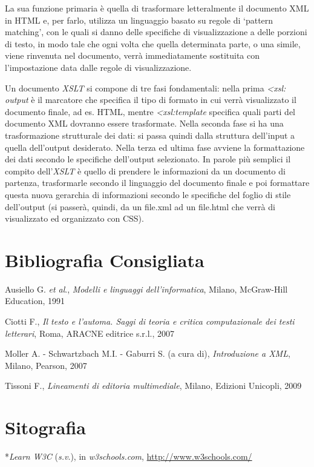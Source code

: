 {La sua funzione primaria è quella di trasformare letteralmente il
documento XML in HTML e, per farlo, utilizza un linguaggio basato su
regole di `pattern matching', con le quali si danno delle specifiche di
visualizzazione a delle porzioni di testo, in modo tale che ogni volta
che quella determinata parte, o una simile, viene rinvenuta nel
documento, verrà immediatamente sostituita con l'impostazione data dalle
regole di visualizzazione.

Un documento \emph{XSLT} si compone di tre fasi fondamentali: nella
prima \emph{\textless{}xsl: output} è il marcatore che
specifica il tipo di formato in cui verrà visualizzato il documento
finale, ad es. HTML, mentre \emph{\textless{}xsl:template}
specifica quali parti del documento XML dovranno essere trasformate.
Nella seconda fase si ha una trasformazione strutturale dei dati: si
passa quindi dalla struttura dell'input a quella dell'output desiderato.
Nella terza ed ultima fase avviene la formattazione dei dati secondo le
specifiche dell'output selezionato. In parole più semplici il compito
dell'\emph{XSLT} è quello di prendere le informazioni da un documento di
partenza, trasformarle secondo il linguaggio del documento finale e poi
formattare questa nuova gerarchia di informazioni secondo le specifiche
del foglio di stile dell'output (si passerà, quindi, da un file.xml ad
un file.html che verrà di visualizzato ed organizzato con CSS).

\section*{Bibliografia Consigliata}
{\parindent0pt 
Ausiello G. \emph{et al}., \emph{Modelli e linguaggi dell'informatica},
Milano, McGraw-Hill Education, 1991

Ciotti F., \emph{Il testo e l'automa. Saggi di teoria e critica
computazionale dei testi letterari}, Roma, ARACNE editrice s.r.l., 2007

Moller A. - Schwartzbach M.I. - Gaburri S. (a cura di),
\emph{Introduzione a XML}, Milano, Pearson, 2007

Tissoni F., \emph{Lineamenti di editoria multimediale}, Milano, Edizioni
Unicopli, 2009
}

\section*{Sitografia}
{\parindent0pt 
*\emph{Learn W3C} (\emph{s.v}.), in \emph{w3schools.com},
\url{http://www.w3schools.com/}
}

}
